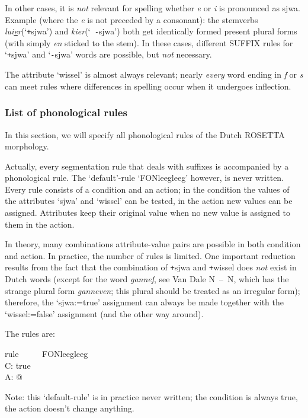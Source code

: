 In other cases, it is {\em not} relevant for spelling whether {\em e} or
{\em i} is 
pronounced as sjwa. Example (where the {\em e} is not preceded by a consonant): 
the stemverbs {\em lui\underline{e}r}(`{\tt +}sjwa') and {\em kier}(`{\tt
-}sjwa') 
both get identically formed present plural forms (with simply {\em en} sticked 
to the stem). In these cases, different SUFFIX rules for `{\tt +}sjwa' and 
`{\tt -}sjwa'
words are possible, but {\em not} necessary.

The attribute `wissel' is almost always relevant; nearly {\em every}
word ending in {\em f} or {\em s} can meet rules where differences in 
spelling occur when it undergoes inflection.


\subsubsection{List of phonological rules}

In this section, we will specify all phonological rules of the Dutch ROSETTA 
morphology.

Actually, every segmentation rule that deals with suffixes is accompanied by
a phonological rule. The `default'-rule `FONleegleeg' however, is never
written. Every rule consists of a condition and an action; in the condition
the values of the attributes `sjwa' and `wissel' can be tested, in the action
new values can be assigned. Attributes keep their original value when no new
value is assigned to them in the action.

In theory, many combinations attribute-value pairs are possible in both 
condition and action. In practice, the number of rules is limited. One important
reduction results from the fact that the combination of {\tt +}sjwa 
and {\tt +}wissel does {\em not} exist in Dutch words 
(except for the word {\em gannef}, see Van Dale N~--~N, which has the strange 
plural form {\em ganneven}; this plural should be treated as an irregular 
form); therefore, the `sjwa:=true' assignment can always be made together with
the `wissel:=false' assignment (and the other way around).

The rules are:

\begin{tabbing}
rule  \ \ \ \ \  \= FONleegleeg \\
C:   \> true        \\
A:   \> @           \\
\end{tabbing}

Note: this `default-rule' is in practice never written; the condition is 
always true, the action doesn't change anything.

